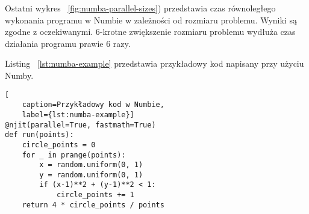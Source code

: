 Ostatni wykres ~\ref{fig:numba-parallel-sizes}) przedstawia czas równoległego wykonania
programu w Numbie w zależności od rozmiaru problemu.
Wyniki są zgodne z oczekiwanymi.
6-krotne zwiększenie rozmiaru problemu wydłuża czas działania programu prawie 6 razy.

Listing ~\ref{lst:numba-example} przedstawia przykładowy kod napisany
przy użyciu Numby.

\begin{lstlisting}[
    caption=Przykładowy kod w Numbie,
    label={lst:numba-example}]
@njit(parallel=True, fastmath=True)
def run(points):
    circle_points = 0
    for _ in prange(points):
        x = random.uniform(0, 1)
        y = random.uniform(0, 1)
        if (x-1)**2 + (y-1)**2 < 1:
            circle_points += 1
    return 4 * circle_points / points
\end{lstlisting}

